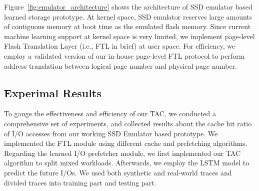Figure~\ref{fig:emulator_architecture} shows the architecture of SSD emulator
based learned storage prototype.
At kernel space, SSD emulator reserves large amounts of contiguous memory
at boot time as the emulated flash memory.
Since current machine learning support at kernel space is very limited,
we implement page-level Flash Translation Layer (i.e., FTL in brief) at user space.
For efficiency, we employ a validated version of our in-house page-level FTL
protocol to perform address translation between logical page number and physical page number.

\subsection{Experimal Results}

To gauge the effectiveness and efficiency of our TAC,
we conducted a comprehensive set of experiments,
and collected results about the cache hit ratio of I/O accesses
from our working SSD Emulator based prototype.
We implemented the FTL module using different cache and prefetching algorithms.
Regarding the learned I/O prefetcher module,
we first implemented our TAC algorithm to split mixed workloads.
Afterwards, we employ the LSTM model to predict the future I/Os.
We used both synthetic and real-world traces and divided traces into training part and testing part.


